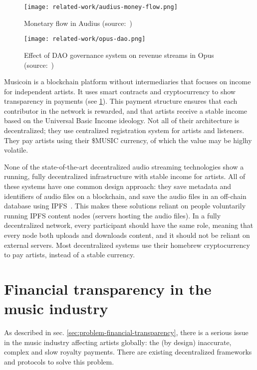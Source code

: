 \begin{figure}
        \texttt{[image: related-work/audius-money-flow.png]}
        \caption{Monetary flow in Audius (source:~\cite{audius2018})}
        \label{fig:monetary-flow-audius}
    \endminipage\hfill
        \texttt{[image: related-work/opus-dao.png]}
        \caption{Effect of DAO governance system on revenue streams in Opus (source:~\citep{jia2016opus})}
        \label{fig:opus-dao}
    \endminipage
\end{figure}

Musicoin is a blockchain platform without intermediaries that focuses on income for independent artists. It uses smart contracts and cryptocurrency to show transparency in payments (see \ref{sec:smart-contracts}). This payment structure ensures that each contributor in the network is rewarded, and that artists receive a stable income based on the Universal Basic Income ideology. Not all of their architecture is decentralized; they use centralized registration system for artists and listeners. They pay artists using their \$MUSIC currency, of which the value may be higlhy volatile.

None of the state-of-the-art decentralized audio streaming technologies show a running, fully decentralized infrastructure with stable income for artists. All of these systems have one common design approach: they save metadata and identifiers of audio files on a blockchain, and save the audio files in an off-chain database using IPFS~\citep{benet2014ipfs}. This makes these solutions reliant on people voluntarily running IPFS content nodes (servers hosting the audio files). In a fully decentralized network, every participant should have the same role, meaning that every node both uploads and downloads content, and it should not be reliant on external servers. Most decentralized systems use their homebrew cryptocurrency to pay artists, instead of a stable currency.

\section{Financial transparency in the music industry}
\label{sec:smart-contracts}
As described in sec. \ref{sec:problem-financial-transparency}, there is a serious issue in the music industry affecting artists globally: the (by design) inaccurate, complex and slow royalty payments. There are existing decentralized frameworks and protocols to solve this problem.

